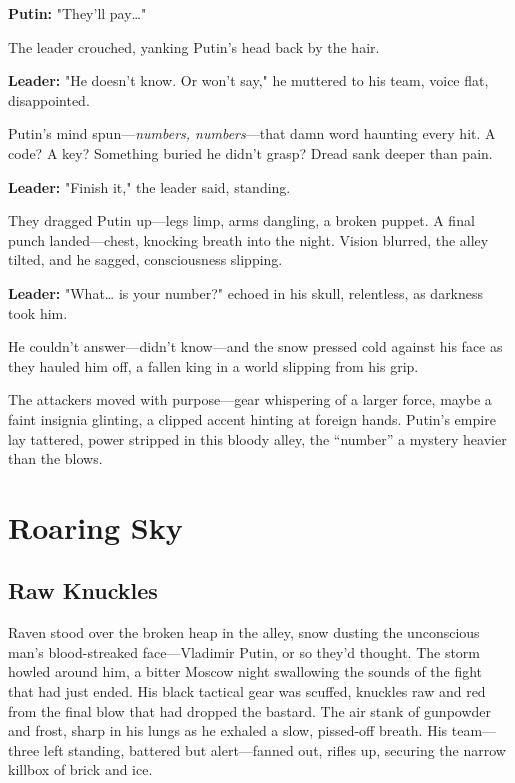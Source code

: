 \documentclass[12pt]{book}
\begin{document}
\vspace{0.5em}
\textbf{Putin:} "They’ll pay…"

The leader crouched, yanking Putin’s head back by the hair.

\vspace{0.5em}
\textbf{Leader:} "He doesn’t know. Or won’t say," he muttered to his team, voice flat, disappointed.

Putin’s mind spun—\emph{numbers, numbers}—that damn word haunting every hit. A code? A key? Something buried he didn’t grasp? Dread sank deeper than pain.

\vspace{0.5em}
\textbf{Leader:} "Finish it," the leader said, standing.

They dragged Putin up—legs limp, arms dangling, a broken puppet. A final punch landed—chest, knocking breath into the night. Vision blurred, the alley tilted, and he sagged, consciousness slipping.

\vspace{0.5em}
\textbf{Leader:} "What… is your number?" echoed in his skull, relentless, as darkness took him.

He couldn’t answer—didn’t know—and the snow pressed cold against his face as they hauled him off, a fallen king in a world slipping from his grip.

The attackers moved with purpose—gear whispering of a larger force, maybe a faint insignia glinting, a clipped accent hinting at foreign hands. Putin’s empire lay tattered, power stripped in this bloody alley, the \enquote{number} a mystery heavier than the blows.

\chapter{Roaring Sky}

\section{Raw Knuckles}

Raven stood over the broken heap in the alley, snow dusting the unconscious man’s blood-streaked face—Vladimir Putin, or so they’d thought. The storm howled around him, a bitter Moscow night swallowing the sounds of the fight that had just ended. His black tactical gear was scuffed, knuckles raw and red from the final blow that had dropped the bastard. The air stank of gunpowder and frost, sharp in his lungs as he exhaled a slow, pissed-off breath. His team—three left standing, battered but alert—fanned out, rifles up, securing the narrow killbox of brick and ice.
\end{document}
